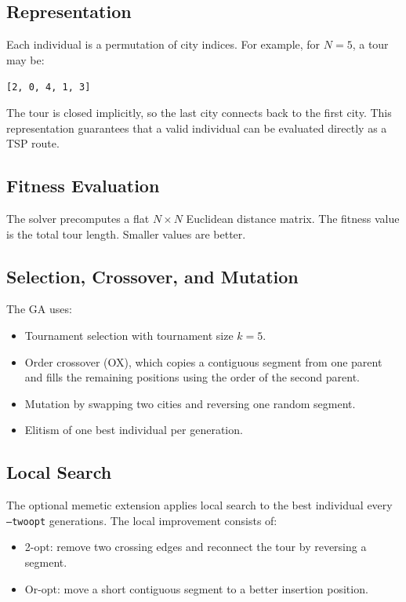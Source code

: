 \documentclass[11pt,a4paper]{article}
\begin{document}
\subsection{Representation}
Each individual is a permutation of city indices. For example, for $N=5$, a
tour may be:

\begin{center}
\texttt{[2, 0, 4, 1, 3]}
\end{center}

The tour is closed implicitly, so the last city connects back to the first city.
This representation guarantees that a valid individual can be evaluated directly
as a TSP route.

\subsection{Fitness Evaluation}
The solver precomputes a flat $N \times N$ Euclidean distance matrix. The
fitness value is the total tour length. Smaller values are better.

\subsection{Selection, Crossover, and Mutation}
The GA uses:

\begin{itemize}[leftmargin=*]
  \item Tournament selection with tournament size $k=5$.
  \item Order crossover (OX), which copies a contiguous segment from one parent
  and fills the remaining positions using the order of the second parent.
  \item Mutation by swapping two cities and reversing one random segment.
  \item Elitism of one best individual per generation.
\end{itemize}

\subsection{Local Search}
The optional memetic extension applies local search to the best individual every
\texttt{--twoopt} generations. The local improvement consists of:

\begin{itemize}[leftmargin=*]
  \item 2-opt: remove two crossing edges and reconnect the tour by reversing a
  segment.
  \item Or-opt: move a short contiguous segment to a better insertion position.
\end{itemize}
\end{document}
